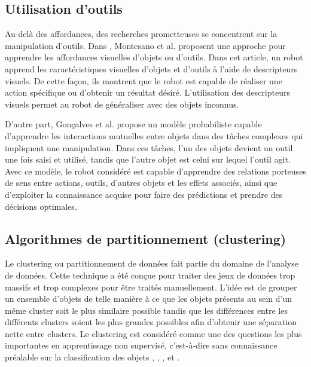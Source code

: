 \documentclass{llncs}
\begin{document}
\subsection{Utilisation d'outils}

Au-delà des affordances, des recherches prometteuses se concentrent sur la manipulation d'outils.
Dans \cite{Montesano2008}, Montesano et al. proposent une approche pour apprendre les affordances visuelles d'objets ou d'outils.
Dans cet article, un robot apprend les caractéristiques visuelles d'objets et d'outils à l'aide de descripteurs visuels.
De cette façon, ils montrent que le robot est capable de réaliser une action spécifique ou d'obtenir un résultat désiré.
L'utilisation des descripteurs visuels permet au robot de généraliser avec des objets inconnus.

D'autre part, Gonçalves et al. \cite{Goncalves2014} propose un modèle probabiliste capable d'apprendre les interactions mutuelles entre objets dans des tâches complexes qui impliquent une manipulation.
Dans ces tâches, l'un des objets devient un outil une fois saisi et utilisé, tandis que l'autre objet est celui sur lequel l'outil agit.
Avec ce modèle, le robot considéré est capable d'apprendre des relations porteuses de sens entre actions, outils, d'autres objets et les effets associés, ainsi que d'exploiter la connaissance acquise pour faire des prédictions et prendre des décisions optimales.




\subsection{Algorithmes de partitionnement (clustering)}

Le clustering ou partitionnement de données fait partie du domaine de l'analyse de données.
Cette technique a été conçue pour traiter des jeux de données trop massifs et trop complexes pour être traités manuellement.
L'idée est de grouper un ensemble d'objets de telle manière à ce que les objets présents au sein d'un même cluster soit le plus similaire possible tandis que les différences entre les différents clusters soient les plus grandes possibles afin d'obtenir une séparation nette entre clusters.
Le clustering est considéré comme une des questions les plus importantes en apprentissage non supervisé, c'est-à-dire sans connaissance préalable sur la classification des objets \cite{Xu2015}, \cite{Andreopoulos2009}, \cite{Fahad2014}, \cite{Tan2005} et \cite{Sajana2016}.
\end{document}

